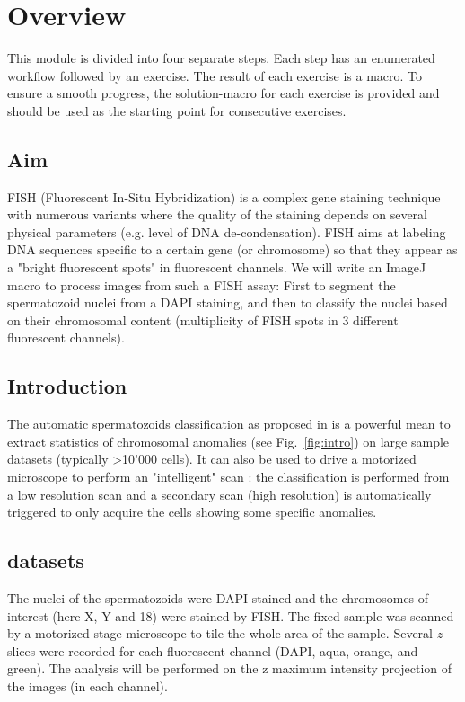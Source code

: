 \section{Overview}

This module is divided into four separate steps. Each step has an enumerated workflow followed by an exercise. The result of each exercise is a macro. To ensure a smooth progress, the solution-macro for each exercise is provided and should be used as the starting point for consecutive exercises.

\subsection{Aim}

FISH (Fluorescent In-Situ Hybridization) is a complex gene staining technique with numerous variants \cite{volpi2008fish} where the quality of the staining depends on several physical parameters (e.g. level of DNA de-condensation). FISH aims at labeling DNA sequences specific to a certain gene (or chromosome) so that they appear as a "bright fluorescent spots" in fluorescent channels. We will write an ImageJ macro to process images from such a FISH assay: First to segment the spermatozoid nuclei from a DAPI staining, and then to classify the nuclei based on their chromosomal content (multiplicity of FISH spots in 3 different fluorescent channels).

\subsection{Introduction}

The automatic spermatozoids classification as proposed in \cite{molina2009fish} is a powerful mean to extract statistics of chromosomal anomalies (see Fig.~\ref{fig:intro}) on large sample datasets (typically >10'000 cells). It can also be used to drive a motorized microscope to perform an "intelligent" scan \cite{tosi2012}: the classification is performed from a low resolution scan and a secondary scan (high resolution) is automatically triggered to only acquire the cells showing some specific anomalies.

\subsection{datasets}
The nuclei of the spermatozoids were DAPI stained and the chromosomes of interest (here X, Y and 18) were  stained by FISH. The fixed sample was scanned by a motorized stage microscope to tile the whole area of the sample. Several $z$ slices were recorded for each fluorescent channel (DAPI, aqua, orange, and green). The analysis will be performed on the z maximum intensity projection of the images (in each channel).